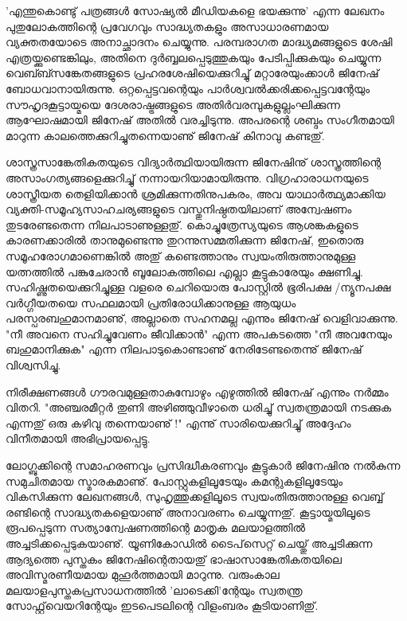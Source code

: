'എന്തുകൊണ്ടു് പത്രങ്ങള്‍ സോഷ്യല്‍ മീഡിയകളെ ഭയക്കുന്നു' എന്ന ലേഖനം പുതുലോകത്തിന്റെ പ്രവേഗവും സാദ്ധ്യതകളും അസാധാരണമായ വ്യക്തതയോടെ അനാച്ഛാദനം ചെയ്യുന്നു. പരമ്പരാഗത മാദ്ധ്യമങ്ങളുടെ ശേഷി എത്രയ്ക്കുണ്ടെങ്കിലും, അതിനെ ദുര്‍ബ്ബലപ്പെടുത്തുകയും പേടിപ്പിക്കുകയും ചെയ്യുന്ന വെബ്ബ്സങ്കേതങ്ങളുടെ പ്രഹരശേഷിയെക്കുറിച്ചു് മറ്റാരേയുംക്കാള്‍ ജിനേഷ് ബോധവാനായിരുന്നു. ഒറ്റപ്പെട്ടവന്റെയും പാര്‍ശ്വവല്‍ക്കരിക്കപ്പെട്ടവന്റേയും സൗഹൃദകൂട്ടായ്മയെ ദേശരാഷ്ട്രങ്ങളുടെ അതിര്‍വരമ്പുകളുല്ലംഘിക്കുന്ന ആഘോഷമായി ജിനേഷ് അതില്‍ വരച്ചിടുന്നു. അപരന്റെ ശബ്ദം സംഗീതമായി മാറുന്ന കാലത്തെക്കുറിച്ചുതന്നെയാണു് ജിനേഷ് കിനാവു കണ്ടതു്.

ശാസ്ത്രസാങ്കേതികതയുടെ വിദ്യാര്‍ത്ഥിയായിരുന്ന ജിനേഷിനു് ശാസ്ത്രത്തിന്റെ അസാംഗത്യങ്ങളെക്കുറിച്ചു് നന്നായറിയാമായിരുന്നു. വിഗ്രഹാരാധനയുടെ ശാസ്ത്രീയത തെളിയിക്കാന്‍ ശ്രമിക്കുന്നതിനുപകരം, അവ യാഥാര്‍ത്ഥ്യമാക്കിയ വ്യക്തി-സമൂഹ്യസാഹചര്യങ്ങളുടെ വസ്തുനിഷ്ഠതയിലാണ് അന്വേഷണം തുടരേണ്ടതെന്ന നിലപാടാണുള്ളതു്. കൊച്ചുത്രേസ്യയുടെ ആശങ്കകളുടെ കാരണക്കാരില്‍ താനുമുണ്ടെന്നു തുറന്നുസമ്മതിക്കുന്ന ജിനേഷ്, ഇതൊരു സമൂഹരോഗമാണെങ്കില്‍ അതു് കണ്ടെത്താനും സ്വയംതിരുത്താനുമുള്ള യത്നത്തില്‍ പങ്കുചേരാന്‍ ബൂലോകത്തിലെ എല്ലാ കൂട്ടുകാരേയും ക്ഷണിച്ചു. സഹിഷ്ണുതയെക്കുറിച്ചുള്ള വളരെ ചെറിയൊരു പോസ്റ്റില്‍ ഭൂരിപക്ഷ /ന്യൂനപക്ഷ വര്‍ഗ്ഗീയതയെ സഫലമായി പ്രതിരോധിക്കാനുള്ള ആയുധം പരസ്പരബഹുമാനമാണു്, അല്ലാതെ സഹനമല്ല എന്നും ജിനേഷ് വെളിവാക്കുന്നു.  "നീ അവനെ സഹിച്ചുവേണം ജീവിക്കാന്‍" എന്ന അപകടത്തെ "നീ അവനേയും ബഹുമാനിക്കുക" എന്ന നിലപാടുകൊണ്ടാണു് നേരിടേണ്ടതെന്നു് ജിനേഷ് വിശ്വസിച്ചു.

നിരീക്ഷണങ്ങള്‍ ഗൗരവമുള്ളതാകുമ്പോഴും എഴുത്തില്‍ ജിനേഷ് എന്നും നര്‍മ്മം വിതറി. "അഞ്ചരമീറ്റര്‍ തുണി അഴിഞ്ഞുവീഴാതെ ധരിച്ചു് സ്വതന്ത്രമായി നടക്കുക എന്നതു് ഒരു കഴിവു തന്നെയാണു് !" എന്നു് സാരിയെക്കുറിച്ചു് അദ്ദേഹം വിനീതമായി അഭിപ്രായപ്പെട്ടു.

ലോഗ്ബുക്കിന്റെ സമാഹരണവും പ്രസിദ്ധീകരണവും കൂട്ടുകാര്‍ ജിനേഷിനു നല്‍കുന്ന സമുചിതമായ സ്മാരകമാണു്. പോസ്റ്റുകളിലൂടേയും കമന്റുകളിലൂടേയും വികസിക്കുന്ന ലേഖനങ്ങള്‍, സുഹൃത്തുക്കളിലൂടെ സ്വയംതിരുത്താനുള്ള വെബ്ബ് രണ്ടിന്റെ സാദ്ധ്യതകളെയാണു് അനാവരണം ചെയ്യുന്നതു്. കൂട്ടായ്മയിലൂടെ രൂപപ്പെടുന്ന സത്യാന്വേഷണത്തിന്റെ മാതൃക മലയാളത്തില്‍ അച്ചടിക്കപ്പെടുകയാണു്. യൂണികോഡില്‍ ടൈപ്‌സെറ്റ് ചെയ്തു് അച്ചടിക്കുന്ന ആദ്യത്തെ പുസ്തകം ജിനേഷിന്റെതായതു് ഭാഷാസാങ്കേതികതയിലെ അവിസ്മരണീയമായ മുഹൂര്‍ത്തമായി മാറുന്നു. വരുംകാല മലയാളപുസ്തകപ്രസാധനത്തില്‍ 'ലാടെക്കി'ന്റേയും സ്വതന്ത്ര സോഫ്റ്റ്‌വെയറിന്റേയും ഇടപെടലിന്റെ വിളംബരം കൂടിയാണിതു്. 

